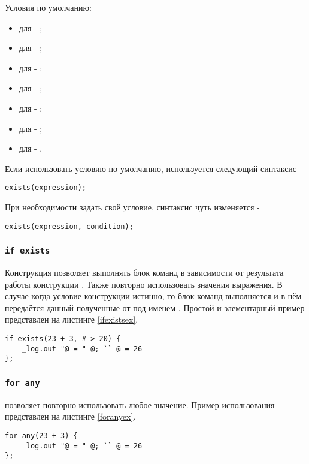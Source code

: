 \documentclass[a4paper, 14pt]{extarticle}
\newenvironment{icItems}
	{ \begin{itemize} [noitemsep,nolistsep] }
	{ \end{itemize} }
\begin{document}
Условия по умолчанию:
\begin{icItems}
\item
	для \bool{} - ;
\item
	для \integer{} - ;
\item
	для \double{} - ;
\item
	для \str{} - ;
\item
	для \listtype{} - ;
\item
	для \set{} - ;
\item
	для \element{} - .
\end{icItems}

Если использовать условию по умолчанию, используется следующий синтаксис -
\begin{lstlisting}[numbers=none]
exists(expression);
\end{lstlisting}
При необходимости задать своё условие, синтаксис чуть изменяется -
\begin{lstlisting}[numbers=none]
exists(expression, condition);
\end{lstlisting}

\subsubsection{\lstinline`if exists`}

Конструкция  позволяет выполнять блок команд в зависимости от результата работы конструкции . Также повторно использовать значения выражения. В случае когда условие конструкции  истинно, то блок команд выполняется и в нём передаётся данный полученные от  под именем .
Простой и элементарный пример представлен на листинге \ref{ifexistsex}.

\begin{lstlisting}[caption=Использование if exist, label=ifexistsex]
if exists(23 + 3, # > 20) {
	_log.out "@ = " @; `` @ = 26
};
\end{lstlisting}

\subsubsection{\lstinline`for any`}

 позволяет повторно использовать любое значение. Пример использования представлен на листинге \ref{foranyex}.

\begin{lstlisting}[caption=Использование for any, label=foranyex]
for any(23 + 3) {
	_log.out "@ = " @; `` @ = 26
};
\end{lstlisting}
\end{document}
